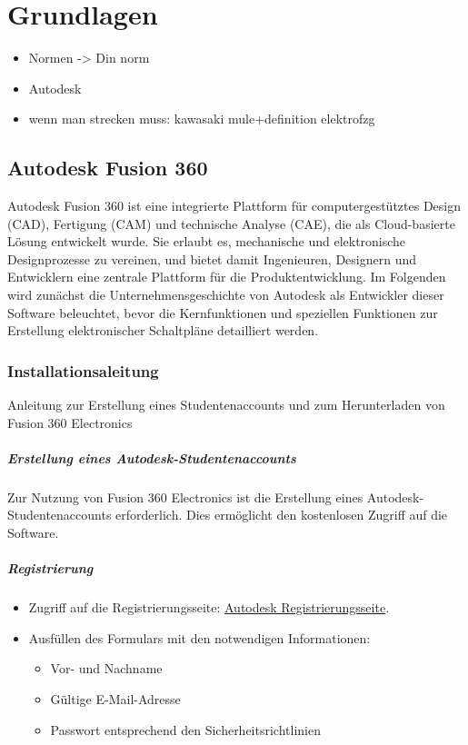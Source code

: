 \chapter{Grundlagen}
\label{cha:Grundlagen}
	\begin{itemize}
	\item Normen -> Din norm
	\item Autodesk
	\item wenn man strecken muss: kawasaki mule+definition elektrofzg
\end{itemize}
\section{Autodesk Fusion 360}
\label{Autodesk}
Autodesk Fusion 360 ist eine integrierte Plattform für computergestütztes Design (CAD), Fertigung (CAM) und technische Analyse (CAE), die als Cloud-basierte Lösung entwickelt wurde. Sie erlaubt es, mechanische und elektronische Designprozesse zu vereinen, und bietet damit Ingenieuren, Designern und Entwicklern eine zentrale Plattform für die Produktentwicklung. Im Folgenden wird zunächst die Unternehmensgeschichte von Autodesk als Entwickler dieser Software beleuchtet, bevor die Kernfunktionen und speziellen Funktionen zur Erstellung elektronischer Schaltpläne detailliert werden.
\subsection{Installationsaleitung}
Anleitung zur Erstellung eines Studentenaccounts und zum Herunterladen von Fusion 360 Electronics

\paragraph*{Erstellung eines Autodesk-Studentenaccounts}
Zur Nutzung von Fusion 360 Electronics ist die Erstellung eines Autodesk-Studentenaccounts erforderlich. Dies ermöglicht den kostenlosen Zugriff auf die Software.

\paragraph{ Registrierung}
\begin{itemize}
	\item Zugriff auf die Registrierungsseite: \href{https://accounts.autodesk.com/register?resume=/as/fMRyxxIM12/resume/as/authorization.ping&ack=uWlmiJuqQqVaAQjGdojc8Qxit4KVdorZ}{\underline{Autodesk Registrierungsseite}}.
	\item Ausfüllen des Formulars mit den notwendigen Informationen:
	\begin{itemize}
		\item Vor- und Nachname
		\item Gültige E-Mail-Adresse
		\item Passwort entsprechend den Sicherheitsrichtlinien
	\end{itemize}
\end{itemize}

